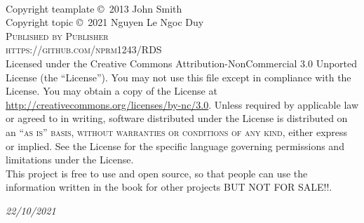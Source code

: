 \documentclass[11pt,fleqn]{book} %
\begin{document}




\newpage
~\vfill
\thispagestyle{empty}

\noindent Copyright teamplate \copyright\ 2013 John Smith\\ %
\noindent Copyright topic \copyright\ 2021 Nguyen Le Ngoc Duy \\ %
\noindent \textsc{Published by Publisher}\\ %

\noindent \textsc{https://github.com/nprm1243/RDS}\\ %

\noindent Licensed under the Creative Commons Attribution-NonCommercial 3.0 Unported License (the ``License''). You may not use this file except in compliance with the License. You may obtain a copy of the License at \url{http://creativecommons.org/licenses/by-nc/3.0}. Unless required by applicable law or agreed to in writing, software distributed under the License is distributed on an \textsc{``as is'' basis, without warranties or conditions of any kind}, either express or implied. See the License for the specific language governing permissions and limitations under the License.\\ %

\noindent This project is free to use and open source, so that people can use the information written in the book for other projects BUT NOT FOR SALE!!.

\noindent \textit{22/10/2021} %



\end{document}
